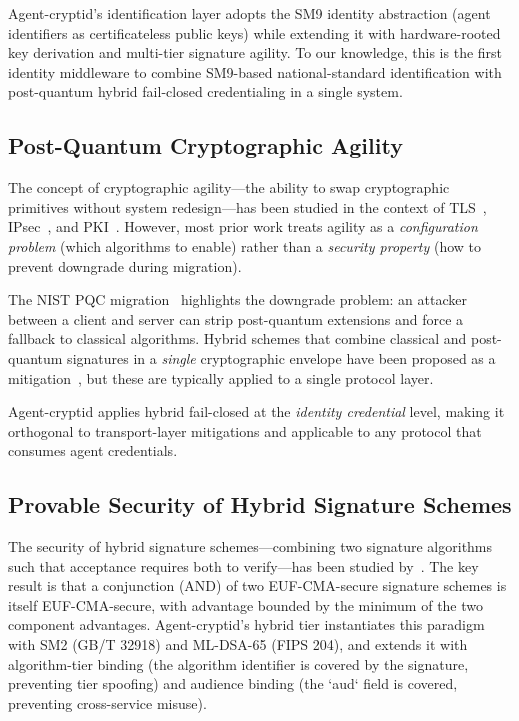 \documentclass[10pt,twocolumn]{IEEEtran}
\begin{document}
Agent-cryptid's identification layer adopts the SM9 identity abstraction
(agent identifiers as certificateless public keys) while extending it
with hardware-rooted key derivation and multi-tier signature
agility. To our knowledge, this is the first identity middleware to
combine SM9-based national-standard identification with post-quantum
hybrid fail-closed credentialing in a single system.

\subsection{Post-Quantum Cryptographic Agility}

The concept of cryptographic agility---the ability to swap cryptographic
primitives without system redesign---has been studied in the context of
TLS~\cite{ref:tls-agility}, IPsec~\cite{ref:ipsec-agility}, and
PKI~\cite{ref:pki-agility}. However, most prior work treats agility as a
\emph{configuration problem} (which algorithms to enable) rather than a
\emph{security property} (how to prevent downgrade during migration).

The NIST PQC migration~\cite{ref:nist-pqm,ref:nist-pqm-migration} highlights the downgrade problem:
an attacker between a client and server can strip post-quantum extensions
and force a fallback to classical algorithms. Hybrid schemes that combine
classical and post-quantum signatures in a \emph{single} cryptographic
envelope have been proposed as a mitigation~\cite{ref:hybrid-tls,ref:hybrid-pq},
but these are typically applied to a single protocol layer.

Agent-cryptid applies hybrid fail-closed at the \emph{identity credential}
level, making it orthogonal to transport-layer mitigations and applicable
to any protocol that consumes agent credentials.

\subsection{Provable Security of Hybrid Signature Schemes}

The security of hybrid signature schemes---combining two signature
algorithms such that acceptance requires both to verify---has been
studied by~\cite{ref:hybrid-provable,ref:hybrid-composition}. The key
result is that a conjunction (AND) of two EUF-CMA-secure signature schemes
is itself EUF-CMA-secure, with advantage bounded by the minimum of the two
component advantages. Agent-cryptid's hybrid tier instantiates this
paradigm with SM2 (GB/T 32918) and ML-DSA-65 (FIPS 204), and extends it
with algorithm-tier binding (the algorithm identifier is covered by the
signature, preventing tier spoofing) and audience binding (the `aud`
field is covered, preventing cross-service misuse).
\end{document}
